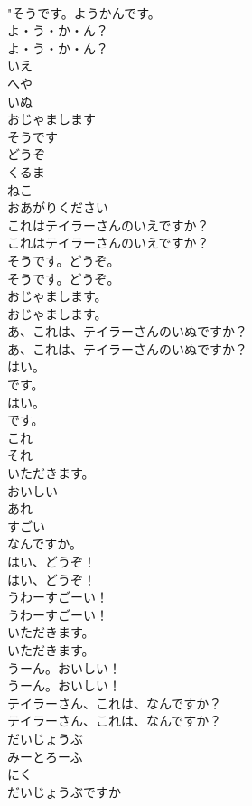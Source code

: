 \documentclass[8pt]{extreport}
\begin{document}
\begin{CJK}{UTF8}{min}
\\	"そうです。ようかんです。 
\\	よ・う・か・ん？	
\\	よ・う・か・ん？ 
\\	いえ
\\	へや
\\	いぬ
\\	おじゃまします
\\	そうです
\\	どうぞ
\\	くるま
\\	ねこ
\\	おあがりください
\\	これはテイラーさんのいえですか？	
\\	これはテイラーさんのいえですか？ 
\\	そうです。どうぞ。	
\\	そうです。どうぞ。 
\\	おじゃまします。	
\\	おじゃまします。 
\\	あ、これは、テイラーさんのいぬですか？	
\\	あ、これは、テイラーさんのいぬですか？ 
\\	はい。
\\	です。	
\\	はい。
\\	です。 
\\	これ
\\	それ
\\	いただきます。
\\	おいしい
\\	あれ
\\	すごい
\\	なんですか。
\\	はい、どうぞ！	
\\	はい、どうぞ！ 
\\	うわーすごーい！	
\\	うわーすごーい！ 
\\	いただきます。	
\\	いただきます。 
\\	うーん。おいしい！	
\\	うーん。おいしい！ 
\\	テイラーさん、これは、なんですか？	
\\	テイラーさん、これは、なんですか？ 
\\	だいじょうぶ
\\	みーとろーふ
\\	にく
\\	だいじょうぶですか

\end{CJK}
\end{document}
